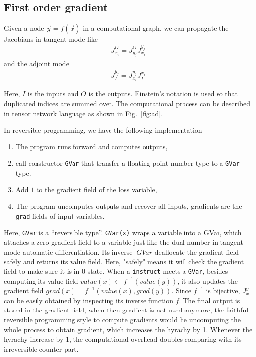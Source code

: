 \documentclass[aps,twocolumn,longbibliography,english,superscriptaddress,prr]{revtex4-1}
\newcommand{\<}{\langle}
\renewcommand{\>}{\rangle}
\newcommand{\out}{{O}}
\newcommand{\inp}{{I}}
\newcommand{\vx}{{x}}
\newcommand{\vy}{{y}}
\newcommand{\Fig}[1]{Fig.~\ref{#1}}
\begin{document}
\subsection{First order gradient}\label{sec:jacobian}
Given a node $\vec y = f(\vec x)$ in a computational graph, we can propagate the Jacobians in tangent mode like
\begin{align}
    J^\out_{x_i} = J^\out_{y_j} J^{y_j}_{x_i}
\end{align}
and the adjoint mode
\begin{align}
    J^{y_j}_\inp = J^{y_j}_{x_i} J_\inp^{x_i}
\end{align}

Here, $\inp$ is the inputs and $\out$ is the outputs.
Einstein's notation is used so that duplicated indices are summed over.
The computational process can be described in tensor network language as shown in \Fig{fig:ad}.

In reversible programming, we have the following implementation
\begin{enumerate}
    \item The program runs forward and computes outputs,
    \item call constructor \texttt{GVar} that transfer a floating point number type to a \texttt{GVar} type.
    \item Add $1$ to the gradient field of the loss variable,
    \item The program uncomputes outputs and recover all inputs, gradients are the \texttt{grad} fields of input variables.
\end{enumerate}

Here, \texttt{GVar} is a ``reversible type''. \texttt{GVar(x)} wraps a variable into a GVar, which attaches a zero gradient field to a variable just like the dual number in tangent mode automatic differentiation. Its inverse $~GVar$ deallocate the gradient field safely and returns its value field. Here, "safely" means it will check the gradient field to make sure it is in $0$ state.
When a \texttt{instruct} meets a \texttt{GVar}, besides computing its value field $value(\vx) \leftarrow f^{-1}(value(\vy))$, it also updates the gradient field $grad(\vx) = f^{-1}(value(\vx), grad(\vy))$. Since $f^{-1}$ is bijective, $J^\vy_\vx$ can be easily obtained by inspecting its inverse function $f$.
The final output is stored in the gradient field, when then gradient is not used anymore, the faithful reversible programming style to compute gradients would be uncomputing the whole process to obtain gradient, which increases the hyrachy by 1. Whenever the hyrachy increase by 1, the computational overhead doubles comparing with its irreversible counter part.
\end{document}
